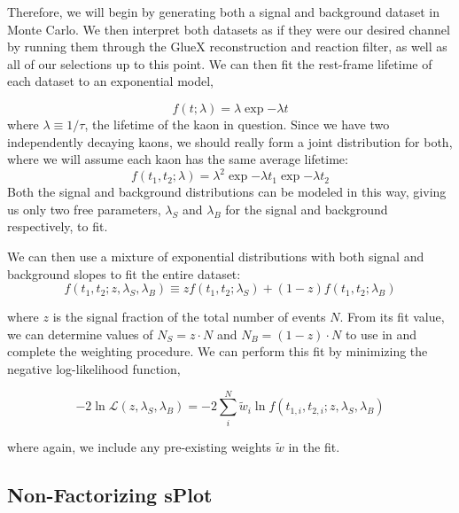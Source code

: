 Therefore, we will begin by generating both a signal and background dataset in Monte Carlo. We then interpret both datasets as if they were our desired channel by running them through the GlueX reconstruction and reaction filter, as well as all of our selections up to this point. We can then fit the rest-frame lifetime of each dataset to an exponential model,

\begin{equation}
  f(t; \lambda) = \lambda \exp{-\lambda t}
  \label{eq:splot-exponential}
\end{equation}
where $\lambda \equiv 1/\tau$, the lifetime of the kaon in question. Since we have two independently decaying kaons, we should really form a joint distribution for both, where we will assume each kaon has the same average lifetime:
\begin{equation}
  f(t_1, t_2; \lambda) = \lambda^2 \exp{-\lambda t_1}\exp{-\lambda t_2}
  \label{eq:splot-exponential_joint}
\end{equation}
Both the signal and background distributions can be modeled in this way, giving us only two free parameters, $\lambda_S$ and $\lambda_B$ for the signal and background respectively, to fit.

We can then use a mixture of exponential distributions with both signal and background slopes to fit the entire dataset:
\begin{equation}
  f(t_1, t_2; z, \lambda_S, \lambda_B) \equiv z f(t_1, t_2; \lambda_S) + (1-z) f(t_1, t_2; \lambda_B)
  \label{eq:splot-mixture}
\end{equation}

where $z$ is the signal fraction of the total number of events $N$. From its fit value, we can determine values of $N_S = z\cdot N$ and $N_B = (1-z)\cdot N$ to use in  and complete the weighting procedure. We can perform this fit by minimizing the negative log-likelihood function,

\begin{equation}
  -2\ln\mathcal{L}(z, \lambda_S, \lambda_B) = -2\sum_i^N \tilde{w}_i \ln f(t_{1,i}, t_{2,i}; z, \lambda_S, \lambda_B)
  \label{eq:splot-nll}
\end{equation}

where again, we include any pre-existing weights $\tilde{w}$ in the fit.

\subsection{Non-Factorizing sPlot}\label{sec:non-factorizing-splot}

